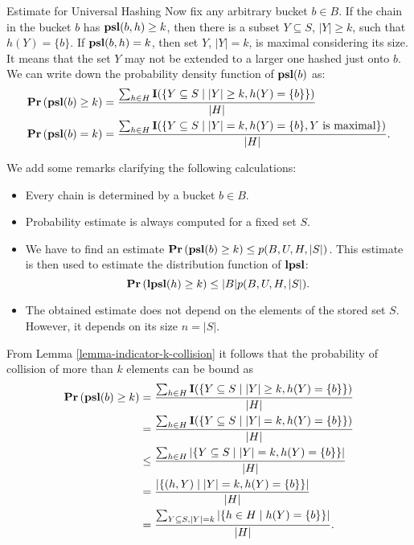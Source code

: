 \begin{section}{Estimate for Universal Hashing}
Now fix any arbitrary bucket $b \in B$. If the chain in the bucket $b$ has $\mathbf{psl}(b, h) \geq k$, then there is a subset $Y \subseteq S$, $|Y| \geq k$, such that $h(Y) = \{ b \}$. If $\mathbf{psl}(b, h) = k$, then set $Y$, $|Y| = k$, is maximal considering its size. It means that the set $Y$ may not be extended to a larger one hashed just onto $b$. We can write down the probability density function of $\mathbf{psl}(b)$ as:
\begin{displaymath}
\begin{split}
\mathbf{Pr}\left(\mathbf{psl}(b) \geq k\right) & = \frac{\sum\displaylimits_{h \in H} \mathbf{I}(\{ Y \subseteq S \mid |Y| \geq k, h(Y) = \{ b \} \})}{|H|} \\
\mathbf{Pr}\left(\mathbf{psl}(b) = k\right) & = \frac{\sum\displaylimits_{h \in H} \mathbf{I}(\{ Y \subseteq S \mid |Y| = k, h(Y) = \{ b \}, Y \text{ is maximal} \})}{|H|} \text{.}
\end{split}
\end{displaymath}

We add some remarks clarifying the following calculations:
\begin{itemize}
\item Every chain is determined by a bucket $b \in B$.
\item Probability estimate is always computed for a fixed set $S$.
\item We have to find an estimate $\mathbf{Pr}\left(\mathbf{psl}(b) \geq k\right) \leq p(B, U, H, |S|)$. This estimate is then used to estimate the distribution function of $\mathbf{lpsl}$: \[ \mathbf{Pr}\left(\mathbf{lpsl}(h) \geq k\right) \leq |B| p(B, U, H, |S|) \text{.} \] 
\item The obtained estimate does not depend on the elements of the stored set $S$. However, it depends on its size $n = |S|$.
\end{itemize}

From Lemma \ref{lemma-indicator-k-collision} it follows that the probability of collision of more than $k$ elements can be bound as
\begin{displaymath}
\begin{split}
\mathbf{Pr}\left(\mathbf{psl}(b) \geq k\right)
	& = \frac{\sum\displaylimits_{h \in H} \mathbf{I}(\{ Y \subseteq S \mid |Y| \geq k, h(Y) = \{ b \} \})}{|H|} \\
	& = \frac{\sum\displaylimits_{h \in H} \mathbf{I}(\{ Y \subseteq S \mid |Y| = k, h(Y) = \{ b \} \})}{|H|} \\
	& \leq \frac{\sum\displaylimits_{h \in H} |\{ Y \subseteq S \mid |Y| = k, h(Y) = \{ b \} \}|}{|H|} \\
	& = \frac{|\{ (h, Y) \mid |Y| = k, h(Y) = \{ b \} \}|}{|H|} \\
	& = \frac{\sum\displaylimits_{Y \subseteq S, |Y| = k} | \{ h \in H \mid h(Y) = \{ b \} \}|}{|H|} \text{.}
\end{split}
\end{displaymath}


\end{section}
